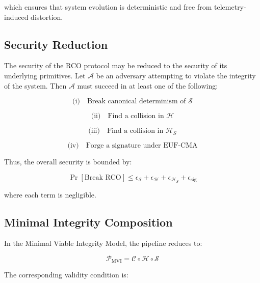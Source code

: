 which ensures that system evolution is deterministic and free from telemetry-induced distortion.

\subsection{Security Reduction}

The security of the RCO protocol may be reduced to the security of its underlying primitives. Let $\mathcal{A}$ be an adversary attempting to violate the integrity of the system. Then $\mathcal{A}$ must succeed in at least one of the following:

\begin{equation}
\text{(i)} \quad \text{Break canonical determinism of } \mathcal{S}
\end{equation}

\begin{equation}
\text{(ii)} \quad \text{Find a collision in } \mathcal{H}
\end{equation}

\begin{equation}
\text{(iii)} \quad \text{Find a collision in } \mathcal{H}_S
\end{equation}

\begin{equation}
\text{(iv)} \quad \text{Forge a signature under EUF-CMA}
\end{equation}

Thus, the overall security is bounded by:

\begin{equation}
\Pr[\text{Break RCO}] \leq \epsilon_{\mathcal{S}} + \epsilon_{\mathcal{H}} + \epsilon_{\mathcal{H}_S} + \epsilon_{\text{sig}}
\end{equation}

where each term is negligible.

\subsection{Minimal Integrity Composition}

In the Minimal Viable Integrity Model, the pipeline reduces to:

\begin{equation}
\mathcal{P}_{\text{MVI}} = \mathcal{C} \circ \mathcal{H} \circ \mathcal{S}
\end{equation}

The corresponding validity condition is:

